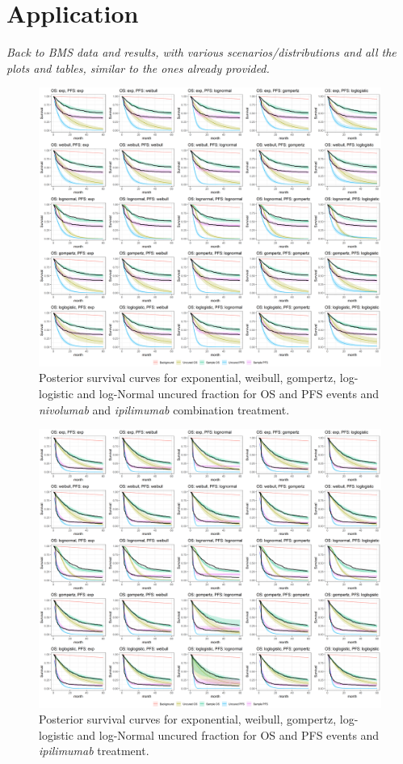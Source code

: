 \documentclass[AMA,STIX1COL]{WileyNJD-v2}
\begin{document}
\section{Application}\label{sec:application}

{\it Back to BMS data and results, with various scenarios/distributions and all the plots and tables, similar to the ones already provided.}

\begin{figure}
\includegraphics[width=0.9\linewidth]{plot_S_grid.png}
\caption{\label{fig:S_grid_ipi_nivo} Posterior survival curves for exponential, weibull, gompertz, log-logistic and log-Normal uncured fraction for OS and PFS events and {\it nivolumab} and {\it ipilimumab} combination treatment.}
\end{figure}

\begin{figure}
\includegraphics[width=0.9\linewidth]{plot_S_grid_IPILIMUMAB.png}
\caption{\label{fig:S_grid_ipi} Posterior survival curves for exponential, weibull, gompertz, log-logistic and log-Normal uncured fraction for OS and PFS events and {\it ipilimumab} treatment.}
\end{figure}
\end{document}
